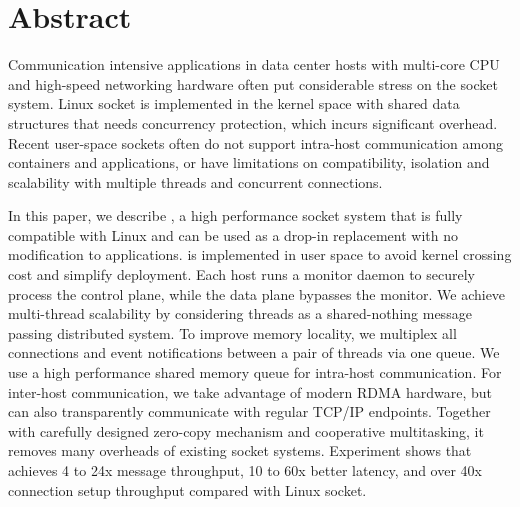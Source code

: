 \section*{Abstract}
Communication intensive applications in data center hosts with multi-core CPU and high-speed networking hardware often put considerable stress on the socket system.
Linux socket is implemented in the kernel space with shared data structures that needs concurrency protection, which incurs significant overhead.
Recent user-space sockets often do not support intra-host communication among containers and applications, or have limitations on compatibility, isolation and scalability with multiple threads and concurrent connections.

In this paper, we describe \sys{}, a high performance socket system that is fully compatible with Linux and can be used as a drop-in replacement with no modification to applications.
\sys{} is implemented in user space to avoid kernel crossing cost and simplify deployment.
Each host runs a monitor daemon to securely process the control plane, while the data plane bypasses the monitor.
We achieve multi-thread scalability by considering threads as a shared-nothing message passing distributed system.
To improve memory locality, we multiplex all connections and event notifications between a pair of threads via one queue.
We use a high performance shared memory queue for intra-host communication.
For inter-host communication, we take advantage of modern RDMA hardware, but can also transparently communicate with regular TCP/IP endpoints.
Together with carefully designed zero-copy mechanism and cooperative multitasking, it removes many overheads of existing socket systems.
Experiment shows that \sys{} achieves 4 to 24x message throughput, 10 to 60x better latency, and over 40x connection setup throughput compared with Linux socket.
